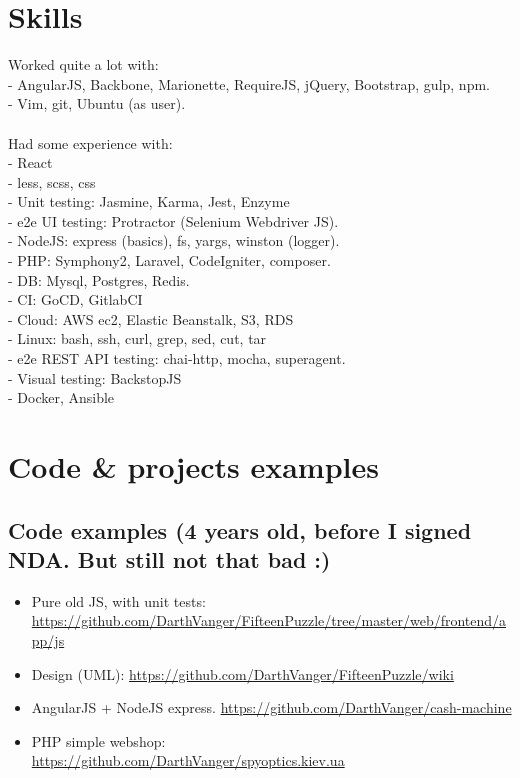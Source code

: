 \documentclass[a4paper, 14pt]{article}
\begin{document}
\section{Skills}
    Worked quite a lot with: \\
    - AngularJS, Backbone, Marionette, RequireJS, jQuery, Bootstrap, gulp, npm. \\
    - Vim, git, Ubuntu (as user). \\
    \\
    Had some experience with: \\
    - React \\
    - less, scss, css \\
    - Unit testing: Jasmine, Karma, Jest, Enzyme \\
    - e2e UI testing: Protractor (Selenium Webdriver JS). \\
    - NodeJS: express (basics), fs, yargs, winston (logger). \\
    - PHP: Symphony2, Laravel, CodeIgniter, composer. \\
    - DB: Mysql, Postgres, Redis. \\
    - CI: GoCD, GitlabCI \\
    - Cloud: AWS ec2, Elastic Beanstalk, S3, RDS \\
    - Linux: bash, ssh, curl, grep, sed, cut, tar \\
    - e2e REST API testing: chai-http, mocha, superagent. \\
    - Visual testing: BackstopJS \\
    - Docker, Ansible \\

\section{Code \& projects examples}
  \subsection{Code examples (4 years old, before I signed NDA. But still not that bad :)}
  \begin{itemize}
    \item Pure old JS, with unit tests: \url{https://github.com/DarthVanger/FifteenPuzzle/tree/master/web/frontend/app/js}
    \\
  \item Design (UML): \url{https://github.com/DarthVanger/FifteenPuzzle/wiki}
    \\
    \item AngularJS + NodeJS express.
      \url{https://github.com/DarthVanger/cash-machine} \\
    \item PHP simple webshop:\\
      \url{https://github.com/DarthVanger/spyoptics.kiev.ua} \\
\end{itemize}
\end{document}
